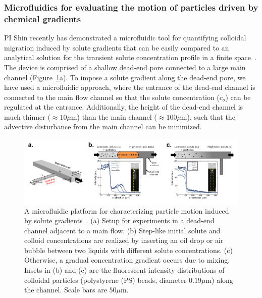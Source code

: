 \documentclass[11pt]{article}
\begin{document}
\subsubsection{Microfluidics for evaluating the motion of particles driven by chemical gradients\label{subsubsec:microfluidics}}
PI Shin recently has demonstrated a microfluidic tool for quantifying
colloidal migration induced by solute gradients that can be easily
compared to an analytical solution for the transient solute
concentration profile in a finite
space~\cite{shin2016,shin2017a,shin2017b}. The device is comprised of a
shallow dead-end pore connected to a large main channel
(Figure~\ref{fig:fig3}a).  To impose a solute gradient along the
dead-end pore, we have used a microfluidic approach, where the entrance
of the dead-end channel is connected to the main flow channel so that
the solute concentration ($c_o$) can be regulated at the entrance.
Additionally, the height of the dead-end channel is much thinner
($\approx 10 \mu$m) than the main channel ($\approx 100 \mu$m), such
that the advective disturbance from the main channel can be minimized.
%
\begin{figure}[h]
\begin{center}
\includegraphics*[keepaspectratio=true,scale=1]{figs/fig3.pdf}
\caption{\label{fig:fig3} A microfluidic platform for characterizing
  particle motion induced by solute gradients~\cite{shin2016,
  shin2017a}. (a) Setup for experiments in a dead-end channel adjacent
  to a main flow. (b) Step-like initial solute and colloid
  concentrations are realized by inserting an oil drop or air bubble
  between two liquids with different solute concentrations. (c)
  Otherwise, a gradual concentration gradient occurs due to mixing.
  Insets in (b) and (c) are the fluorescent intensity distributions of
  colloidal particles (polystyrene (PS) beads, diameter $0.19 \mu$m)
  along the channel. Scale bars are $50 \mu$m.}
\end{center}
\end{figure}
\end{document}
